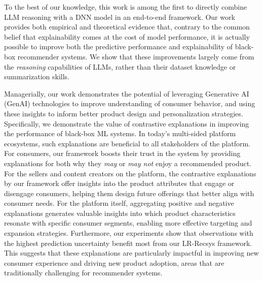 To the best of our knowledge, this work is among the first to directly combine LLM reasoning with a DNN model in an end-to-end framework. Our work provides both empirical and theoretical evidence that, contrary to the common belief that explainability comes at the cost of model performance, it is actually possible to improve both the predictive performance and explainability of black-box recommender systems. We show that these improvements largely come from the \emph{reasoning} capabilities of LLMs, rather than their dataset knowledge or summarization skills. %


Managerially, our work demonstrates the potential of leveraging Generative AI (GenAI) technologies to improve understanding of consumer behavior, and using these insights to inform better product design and personalization strategies. Specifically, we demonstrate the value of contrastive explanations in improving the performance of black-box ML systems. In today’s multi-sided platform ecosystems, such explanations are beneficial to all stakeholders of the platform. For consumers, our framework boosts their trust in the system by providing explanations for both why they \emph{may} or \emph{may not} enjoy a recommended product. For the sellers and content creators on the platform, the contrastive explanations by our framework offer insights into the product attributes that engage or disengage consumers, helping them design future offerings that better align with consumer needs. For the platform itself, aggregating positive and negative explanations generates valuable insights into which product characteristics resonate with specific consumer segments, enabling more effective targeting and expansion strategies. Furthermore, our experiments show that observations with the highest prediction uncertainty benefit most from our LR-Recsys framework. This suggests that these explanations are particularly impactful in improving new consumer experience and driving new product adoption, areas that are traditionally challenging for recommender systems.


